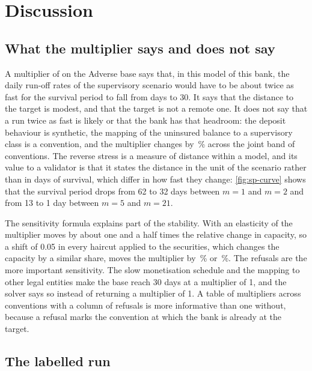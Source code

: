\section{Discussion}
\label{sec:discussion}

\subsection{What the multiplier says and does not say}

A multiplier of \mAdv{} on the Adverse base says that, in this model of this bank, the daily run-off rates of the supervisory scenario would have to be about twice as fast for the survival period to fall from \spAdv{} days to 30. It says that the distance to the target is modest, and that the target is not a remote one. It does not say that a run twice as fast is likely or that the bank has that headroom: the deposit behaviour is synthetic, the mapping of the uninsured balance to a supervisory class is a convention, and the multiplier changes by \jointDevAdv{}\,\% across the joint band of conventions. The reverse stress is a measure of distance within a model, and its value to a validator is that it states the distance in the unit of the scenario rather than in days of survival, which differ in how fast they change: \cref{fig:sp-curve} shows that the survival period drops from 62 to 32 days between $m=1$ and $m=2$ and from 13 to 1 day between $m=5$ and $m=21$.

The sensitivity formula explains part of the stability. With an elasticity of \elastAdv{} the multiplier moves by about one and a half times the relative change in capacity, so a shift of 0.05 in every haircut applied to the securities, which changes the capacity by a similar share, moves the multiplier by \hcLowAdvPct{}\,\% or \hcHighAdvPct{}\,\%. The refusals are the more important sensitivity. The slow monetisation schedule and the mapping to other legal entities make the base reach 30 days at a multiplier of 1, and the solver says so instead of returning a multiplier of 1. A table of multipliers across conventions with a column of refusals is more informative than one without, because a refusal marks the convention at which the bank is already at the target.

\subsection{The labelled run}

